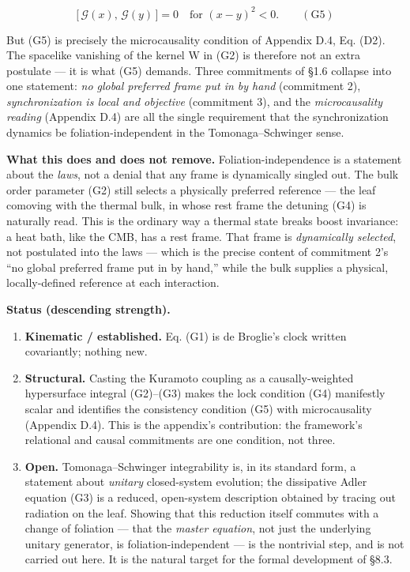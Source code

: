 \documentclass[
]{article}
\providecommand{\tightlist}{%
  \setlength{\itemsep}{0pt}\setlength{\parskip}{0pt}}
\begin{document}
\[\big[\,\mathcal{G}(x),\,\mathcal{G}(y)\,\big] = 0 \quad \text{for } (x-y)^2 < 0. \qquad (\mathrm{G5})\]

But (G5) is precisely the microcausality condition of Appendix D.4, Eq.
(D2). The spacelike vanishing of the kernel W in (G2) is therefore not
an extra postulate --- it is what (G5) demands. Three commitments of
§1.6 collapse into one statement: \emph{no global preferred frame put in
by hand} (commitment 2), \emph{synchronization is local and objective}
(commitment 3), and the \emph{microcausality reading} (Appendix D.4) are
all the single requirement that the synchronization dynamics be
foliation-independent in the Tomonaga--Schwinger sense.

\textbf{What this does and does not remove.} Foliation-independence is a
statement about the \emph{laws}, not a denial that any frame is
dynamically singled out. The bulk order parameter (G2) still selects a
physically preferred reference --- the leaf comoving with the thermal
bulk, in whose rest frame the detuning (G4) is naturally read. This is
the ordinary way a thermal state breaks boost invariance: a heat bath,
like the CMB, has a rest frame. That frame is \emph{dynamically
selected}, not postulated into the laws --- which is the precise content
of commitment 2's ``no global preferred frame put in by hand,'' while
the bulk supplies a physical, locally-defined reference at each
interaction.

\textbf{Status (descending strength).}

\begin{enumerate}
\def\labelenumi{\arabic{enumi}.}
\tightlist
\item
  \textbf{Kinematic / established.} Eq. (G1) is de Broglie's clock
  written covariantly; nothing new.
\item
  \textbf{Structural.} Casting the Kuramoto coupling as a
  causally-weighted hypersurface integral (G2)--(G3) makes the lock
  condition (G4) manifestly scalar and identifies the consistency
  condition (G5) with microcausality (Appendix D.4). This is the
  appendix's contribution: the framework's relational and causal
  commitments are one condition, not three.
\item
  \textbf{Open.} Tomonaga--Schwinger integrability is, in its standard
  form, a statement about \emph{unitary} closed-system evolution; the
  dissipative Adler equation (G3) is a reduced, open-system description
  obtained by tracing out radiation on the leaf. Showing that this
  reduction itself commutes with a change of foliation --- that the
  \emph{master equation}, not just the underlying unitary generator, is
  foliation-independent --- is the nontrivial step, and is not carried
  out here. It is the natural target for the formal development of §8.3.
\end{enumerate}
\end{document}
